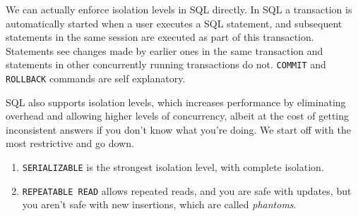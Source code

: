     We can actually enforce isolation levels in SQL directly. In SQL a transaction is automatically started when a user executes a SQL statement, and subsequent statements in the same session are executed as part of this transaction. Statements see changes made by earlier ones in the same transaction and statements in other concurrently running transactions do not. \texttt{COMMIT} and \texttt{ROLLBACK} commands are self explanatory.  
     
    SQL also supports isolation levels, which increases performance by eliminating overhead and allowing higher levels of concurrency, albeit at the cost of getting inconsistent answers if you don't know what you're doing. We start off with the most restrictive and go down. 
    \begin{enumerate}
      \item \texttt{SERIALIZABLE} is the strongest isolation level, with complete isolation. 

      \item \texttt{REPEATABLE READ} allows repeated reads, and you are safe with updates, but you aren't safe with new insertions, which are called \textit{phantoms}. 

      \begin{figure}[H]
        \centering 
\end{figure}
\end{enumerate}
